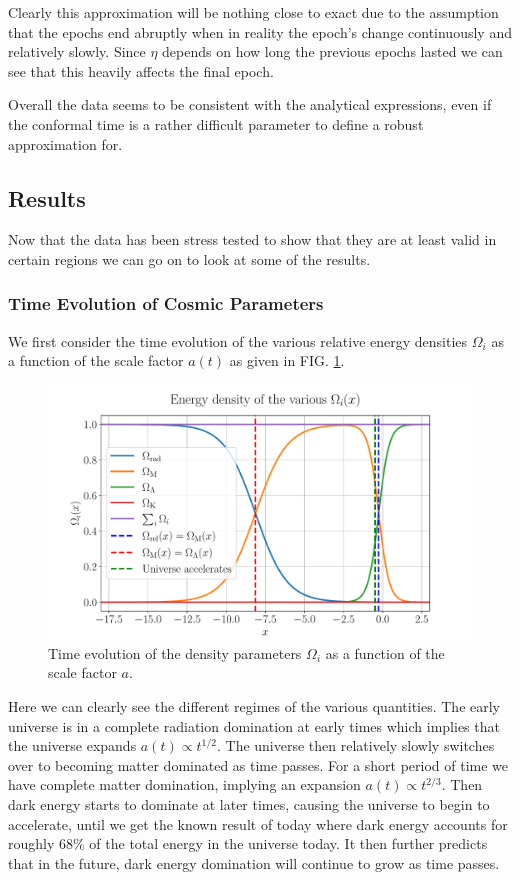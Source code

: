 \documentclass[%
reprint,
 amsmath,amssymb,
 aps,
]{revtex4-2}
\begin{document}
Clearly this approximation will be nothing close to exact due to the assumption that the epochs end abruptly when in reality the epoch's change continuously and relatively slowly. Since $\eta$ depends on how long the previous epochs lasted we can see that this heavily affects the final epoch. 

Overall the data seems to be consistent with the analytical expressions, even if the conformal time is a rather difficult parameter to define a robust approximation for.

\subsection{Results}

Now that the data has been stress tested to show that they are at least valid in certain regions we can go on to look at some of the results.
\subsubsection{Time Evolution of  Cosmic Parameters}
We first consider the time evolution of the various relative energy densities $\Omega_i$ as a function of the scale factor $a(t)$ as given in FIG. \ref{fig:Omegai}.
\begin{figure}[ht!]
	\includegraphics[width = \linewidth]{Figures/Omega_i.pdf}
	\caption{Time evolution of the density parameters $\Omega_i$ as a function of the scale factor $a$.}
	\label{fig:Omegai}
\end{figure}

Here we can clearly see the different regimes of the various quantities. The early universe is in a complete radiation domination at early times which implies that the universe expands $a(t)\propto t^{1/2}$. The universe then relatively slowly switches over to becoming matter dominated as time passes. For a short period of time we have complete matter domination, implying an expansion $a(t)\propto t^{2/3}$. Then dark energy starts to dominate at later times, causing the universe to begin to accelerate, until we get the known result of today where dark energy accounts for roughly 68\% of the total energy in the universe today. It then further predicts that in the future, dark energy domination will continue to grow as time passes.
\end{document}
